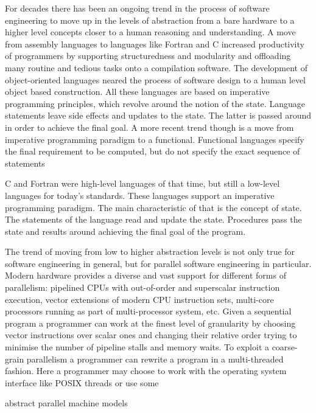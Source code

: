 
\quad For decades there has been an ongoing trend in the process of software engineering to move up in the levels of abstraction from a bare hardware to a higher level concepts closer to a human reasoning and understanding.\newline\null
\quad A move from assembly languages to languages like Fortran and C increased productivity of programmers by supporting structuredness and modularity and offloading many routine and tedious tasks onto a compilation software. The development of object-oriented languages neared the process of software design to a human level object based construction. All these languages are based on imperative programming principles, which revolve around the notion of the state. Language statements leave side effects and updates to the state. The latter is passed around in order to achieve the final goal. A more recent trend though is a move from imperative programming paradigm to a functional. Functional languages specify the final requirement to be computed, but do not specify the exact sequence of statements   


C and Fortran were high-level languages of that time, but still a low-level languages for today's standards. These languages support an imperative programming paradigm. The main characteristic of that is the concept of state. The statements of the language read and update the state. Procedures pass the state and results around achieving the final goal of the program.   

\quad The trend of moving from low to higher abstraction levels is not only true for software engineering in general, but for parallel software engineering in particular. Modern hardware provides a diverse and vast support for different forms of parallelism: pipelined CPUs with out-of-order and superscalar instruction execution, vector extensions of modern CPU instruction sets, multi-core processors running as part of multi-processor system, etc. Given a sequential program a programmer can work at the finest level of granularity by choosing vector instructions over scalar ones and changing their relative order trying to minimise the number of pipeline stalls and memory waits. To exploit a coarse-grain parallelism a programmer can rewrite a program in a multi-threaded fashion. Here a programmer may choose to work with the operating system interface like POSIX threads or use some 

abstract parallel machine models   

